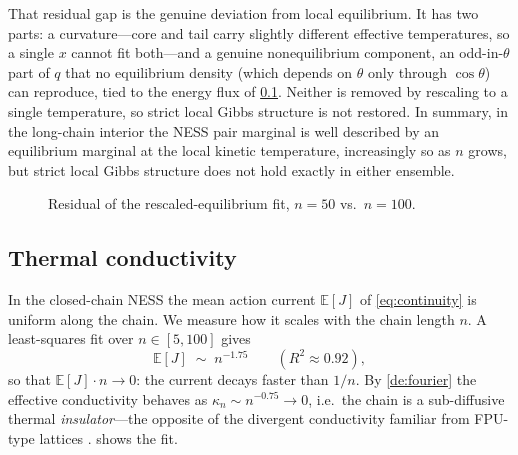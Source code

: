 \documentclass[11pt,a4paper]{article}
\theoremstyle{definition}
\newcommand{\E}{\mathbb{E}}
\numberwithin{equation}{section}   %
\begin{document}
That residual gap is the genuine deviation from local equilibrium. It has two
parts: a curvature---core and tail carry slightly different effective
temperatures, so a single $x$ cannot fit both---and a genuine nonequilibrium
component, an odd-in-$\theta$ part of $q$ that no equilibrium density (which
depends on $\theta$ only through $\cos\theta$) can reproduce, tied to the
energy flux of \cref{sec:thermal-conductivity}. Neither is removed by
rescaling to a single temperature, so strict local Gibbs structure is not
restored. In summary, in the long-chain interior the NESS pair marginal is
well described by an equilibrium marginal at the local kinetic temperature,
increasingly so as $n$ grows, but strict local Gibbs structure does not hold
exactly in either ensemble.

\begin{figure}[ht]
  \centering
  \caption{Residual of the rescaled-equilibrium fit, $n=50$ vs.\ $n=100$.}
  \label{fig:lte-resid}
\end{figure}

\subsection{Thermal conductivity}\label{sec:thermal-conductivity}

In the closed-chain NESS the mean action current $\E[J]$ of
\eqref{eq:continuity} is uniform along the chain. We measure how it scales with
the chain length $n$. A least-squares fit over $n\in[5,100]$ gives
\begin{equation}\label{eq:flux-scaling}
  \E[J] \;\sim\; n^{-1.75}\qquad (R^2\approx0.92),
\end{equation}
so that $\E[J]\cdot n\to0$: the current decays faster than $1/n$. By
\cref{de:fourier} the effective conductivity behaves as $\kappa_n\sim n^{-0.75}
\to 0$, i.e.\ the chain is a sub-diffusive thermal \emph{insulator}---the
opposite of the divergent conductivity familiar from FPU-type lattices
\cite{LepriLiviPoliti}.  shows the fit.
\end{document}
